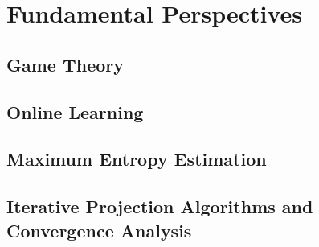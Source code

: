 \documentclass[11pt]{article}
\begin{document}
\section{Fundamental Perspectives}
\subsection{Game Theory}
\subsection{Online Learning}
\subsection{Maximum Entropy Estimation}
\subsection{Iterative Projection Algorithms and Convergence Analysis}


\newpage


\end{document}
